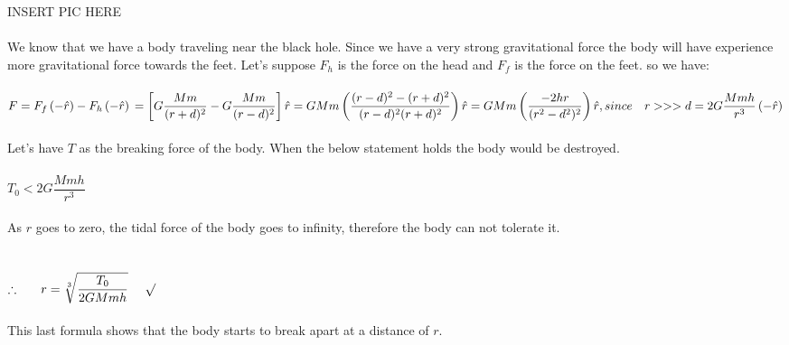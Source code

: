 \documentclass[fleqn]{article}
\begin{document}
\begin{enumerate}
      \textcolor{hwColor}{
        INSERT PIC HERE
        \\
        \\
        We know that we have a body traveling near the black hole. Since we have a very strong gravitational force the
        body will have experience more gravitational force towards the feet. Let's suppose $F_h$ is the force on the head 
        and $F_f$ is the force on the feet. so we have: \\
        \\ 
        $
          F=F_f \left(-\hat{r}\right)-F_h \left(-\hat{r}\right)
          \\
          \\
          \\
          =\left[G\dfrac{Mm}{(r+d)^2}-G\dfrac{Mm}{(r-d)^2}\right] \hat{r}
          \\
          \\
          \\
          =GMm \left(\dfrac{(r-d)^2-(r+d)^2}{(r-d)^2(r+d)^2}\right) \hat{r}
          \\
          \\
          \\
          =GMm \left(\dfrac{-2hr}{(r^2-d^2)^2}\right) \hat{r}, since ~~~ r>>>d
          \\
          \\
          \\
          =2G\dfrac{Mmh}{r^3} \left(-\hat{r}\right) 
        $ 
        \\
        \\
        Let's have $T$ as the breaking force of the body. When the below statement holds the body
        would be destroyed.
        \\
        \\
        $
          T_0< 2G\dfrac{Mmh}{r^3}
        $
        \\
        \\
        As $r$ goes to zero, the tidal force of the body goes to infinity, therefore the body can not tolerate it.
        \\
        \\
        \\
        $
          \therefore ~~~~~ r=\sqrt[3]{\dfrac{T_0}{2GMmh}} ~~~~ \surd
        $
        \\
        \\
        This last formula shows that the body starts to break apart at a distance of $r$.
      }


\end{enumerate}
\end{document}
